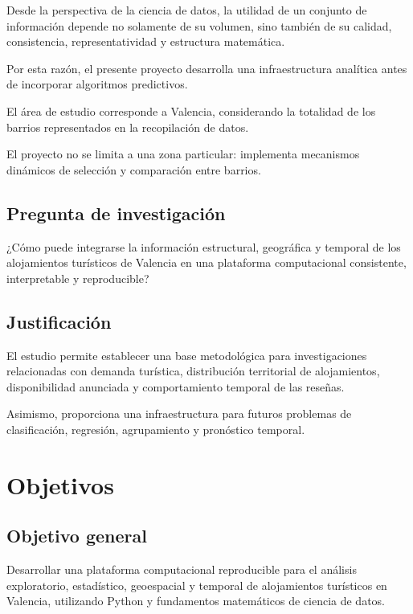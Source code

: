 \documentclass[11pt,a4paper]{article}
\begin{document}
Desde la perspectiva de la ciencia de datos,
la utilidad de un conjunto de información depende
no solamente de su volumen, sino también de su calidad,
consistencia, representatividad y estructura matemática.

Por esta razón, el presente proyecto desarrolla una
infraestructura analítica antes de incorporar algoritmos
predictivos.

El área de estudio corresponde a Valencia, considerando
la totalidad de los barrios representados en la
recopilación de datos.

El proyecto no se limita a una zona particular:
implementa mecanismos dinámicos de selección y
comparación entre barrios.

\subsection{Pregunta de investigación}

¿Cómo puede integrarse la información estructural,
geográfica y temporal de los alojamientos turísticos
de Valencia en una plataforma computacional
consistente, interpretable y reproducible?

\subsection{Justificación}

El estudio permite establecer una base metodológica
para investigaciones relacionadas con demanda turística,
distribución territorial de alojamientos, disponibilidad
anunciada y comportamiento temporal de las reseñas.

Asimismo, proporciona una infraestructura para futuros
problemas de clasificación, regresión, agrupamiento
y pronóstico temporal.


\section{Objetivos}

\subsection{Objetivo general}

Desarrollar una plataforma computacional reproducible
para el análisis exploratorio, estadístico, geoespacial
y temporal de alojamientos turísticos en Valencia,
utilizando Python y fundamentos matemáticos de
ciencia de datos.
\end{document}
